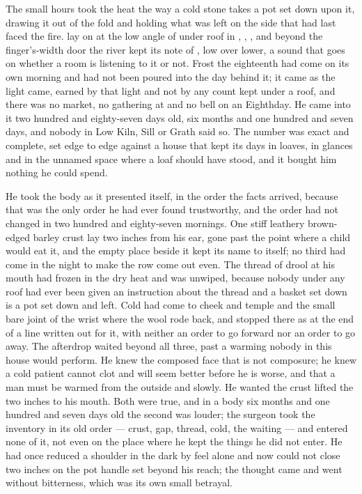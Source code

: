 
The small hours took the heat the way a cold stone takes a pot set down upon it, drawing it out of the fold and holding what was left on the side that had last faced the fire.  lay on  at the low angle of  under  roof in , , , and beyond the finger's-width door the river kept its note of , low over lower, a sound that goes on whether a room is listening to it or not. Frost the eighteenth had come on its own morning and had not been poured into the day behind it; it came as the light came, earned by that light and not by any count kept under a roof, and there was no market, no gathering at  and no bell on an Eighthday. He came into it two hundred and eighty-seven days old, six months and one hundred and seven days, and nobody in Low Kiln, Sill or Grath said so. The number was exact and complete, set edge to edge against a house that kept its days in loaves, in glances and in the unnamed space where a loaf should have stood, and it bought him nothing he could spend.

He took the body as it presented itself, in the order the facts arrived, because that was the only order he had ever found trustworthy, and the order had not changed in two hundred and eighty-seven mornings. One stiff leathery brown-edged barley crust lay two inches from his ear, gone past the point where a child would eat it, and the empty place beside it kept its name to itself; no third had come in the night to make the row come out even. The thread of drool at his mouth had frozen in the dry heat and was unwiped, because nobody under any roof had ever been given an instruction about the thread and a basket set down is a pot set down and left. Cold had come to cheek and temple and the small bare joint of the wrist where the wool rode back, and stopped there as at the end of a line written out for it, with neither an order to go forward nor an order to go away. The afterdrop waited beyond all three, past a warming nobody in this house would perform. He knew the composed face that is not composure; he knew a cold patient cannot clot and will seem better before he is worse, and that a man must be warmed from the outside and slowly. He wanted the crust lifted the two inches to his mouth. Both were true, and in a body six months and one hundred and seven days old the second was louder; the surgeon took the inventory in its old order --- crust, gap, thread, cold, the waiting --- and entered none of it, not even on the place where he kept the things he did not enter. He had once reduced a shoulder in the dark by feel alone and now could not close two inches on the pot handle set beyond his reach; the thought came and went without bitterness, which was its own small betrayal.

